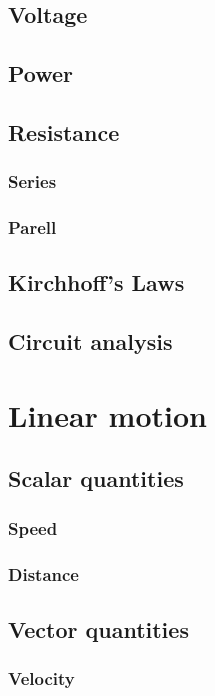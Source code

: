\documentclass{book}
\begin{document}
\section{Voltage}


\section{Power}


\section{Resistance}
\subsection{Series}

\subsection{Parell}

\section{Kirchhoff's Laws}

\section{Circuit analysis}



\chapter{Linear motion}
\section{Scalar quantities}
\subsection{Speed}

\subsection{Distance}


\section{Vector quantities}
\subsection{Velocity}
\end{document}
